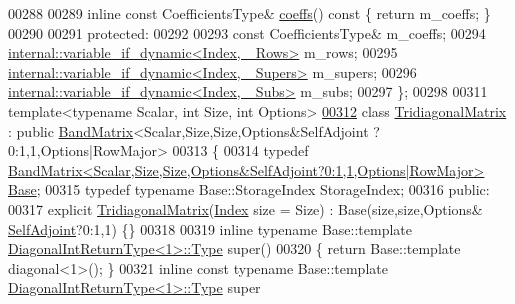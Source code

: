 \begin{DoxyCode}
00288 
00289     \textcolor{keyword}{inline} \textcolor{keyword}{const} CoefficientsType& \hyperlink{class_eigen_1_1internal_1_1_band_matrix_base_ab7c9e9a7ca5ad0f2f3a82ac582650499}{coeffs}()\textcolor{keyword}{ const }\{ \textcolor{keywordflow}{return} m\_coeffs; \}
00290 
00291   \textcolor{keyword}{protected}:
00292 
00293     \textcolor{keyword}{const} CoefficientsType& m\_coeffs;
00294     \hyperlink{class_eigen_1_1internal_1_1variable__if__dynamic}{internal::variable\_if\_dynamic<Index, \_Rows>}   m\_rows;
00295     \hyperlink{class_eigen_1_1internal_1_1variable__if__dynamic}{internal::variable\_if\_dynamic<Index, \_Supers>} m\_supers;
00296     \hyperlink{class_eigen_1_1internal_1_1variable__if__dynamic}{internal::variable\_if\_dynamic<Index, \_Subs>}   m\_subs;
00297 \};
00298 
00311 \textcolor{keyword}{template}<\textcolor{keyword}{typename} Scalar, \textcolor{keywordtype}{int} Size, \textcolor{keywordtype}{int} Options>
\hyperlink{group___core___module}{00312} \textcolor{keyword}{class }\hyperlink{group___core___module_class_eigen_1_1internal_1_1_tridiagonal_matrix}{TridiagonalMatrix} : \textcolor{keyword}{public} \hyperlink{group___core___module_class_eigen_1_1internal_1_1_band_matrix}{BandMatrix}<Scalar,Size,Size,Options&SelfAdjoint
      ?0:1,1,Options|RowMajor>
00313 \{
00314     \textcolor{keyword}{typedef} 
      \hyperlink{group___core___module}{BandMatrix<Scalar,Size,Size,Options&SelfAdjoint?0:1,1,Options|RowMajor>}
       \hyperlink{group___core___module_struct_eigen_1_1_eigen_base}{Base};
00315     \textcolor{keyword}{typedef} \textcolor{keyword}{typename} Base::StorageIndex StorageIndex;
00316   \textcolor{keyword}{public}:
00317     \textcolor{keyword}{explicit} \hyperlink{group___core___module_class_eigen_1_1internal_1_1_tridiagonal_matrix}{TridiagonalMatrix}(\hyperlink{group___core___module_a554f30542cc2316add4b1ea0a492ff02}{Index} size = Size) : Base(size,size,Options&
      \hyperlink{group__enums_gga39e3366ff5554d731e7dc8bb642f83cda2491fc6765056421f504eb7e16083e8f}{SelfAdjoint}?0:1,1) \{\}
00318 
00319     \textcolor{keyword}{inline} \textcolor{keyword}{typename} Base::template \hyperlink{struct_eigen_1_1internal_1_1_band_matrix_base_1_1_diagonal_int_return_type}{DiagonalIntReturnType<1>::Type} super()
00320     \{ \textcolor{keywordflow}{return} Base::template diagonal<1>(); \}
00321     \textcolor{keyword}{inline} \textcolor{keyword}{const} \textcolor{keyword}{typename} Base::template \hyperlink{struct_eigen_1_1internal_1_1_band_matrix_base_1_1_diagonal_int_return_type}{DiagonalIntReturnType<1>::Type} super

\end{DoxyCode}

